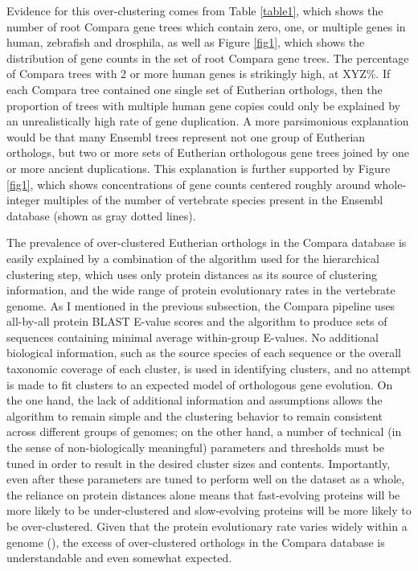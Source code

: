 Evidence for this over-clustering comes from Table \ref{table1}, which
shows the number of root Compara gene trees which contain zero, one,
or multiple genes in human, zebrafish and drosphila, as well as Figure
\ref{fig1}, which shows the distribution of gene counts in the set of
root Compara gene trees. The percentage of Compara trees with 2 or
more human genes is strikingly high, at XYZ\%. If each Compara tree
contained one single set of Eutherian orthologs, then the proportion
of trees with multiple human gene copies could only be explained by an
unrealistically high rate of gene duplication. A more parsimonious
explanation would be that many Ensembl trees represent not one group
of Eutherian orthologs, but two or more sets of Eutherian orthologous
gene trees joined by one or more ancient duplications. This
explanation is further supported by Figure \ref{fig1}, which shows
concentrations of gene counts centered roughly around whole-integer
multiples of the number of vertebrate species present in the Ensembl
database (shown as gray dotted lines).

The prevalence of over-clustered Eutherian orthologs in the Compara
database is easily explained by a combination of the \hclust algorithm
used for the hierarchical clustering step, which uses only protein
distances as its source of clustering information, and the wide range
of protein evolutionary rates in the vertebrate genome. As I mentioned
in the previous subsection, the Compara pipeline uses all-by-all
protein BLAST E-value scores and the \hclust algorithm to produce sets
of sequences containing minimal average within-group E-values. No
additional biological information, such as the source species of each
sequence or the overall taxonomic coverage of each cluster, is used in
identifying clusters, and no attempt is made to fit clusters to an
expected model of orthologous gene evolution. On the one hand, the
lack of additional information and assumptions allows the algorithm to
remain simple and the clustering behavior to remain consistent across
different groups of genomes; on the other hand, a number of technical
(in the sense of non-biologically meaningful) parameters and
thresholds must be tuned in order to result in the desired cluster
sizes and contents. Importantly, even after these parameters are tuned
to perform well on the dataset as a whole, the reliance on protein
distances alone means that fast-evolving proteins will be more likely
to be under-clustered and slow-evolving proteins will be more likely
to be over-clustered. Given that the protein evolutionary rate varies
widely within a genome (), the excess of
over-clustered orthologs in the Compara database is understandable and
even somewhat expected.

